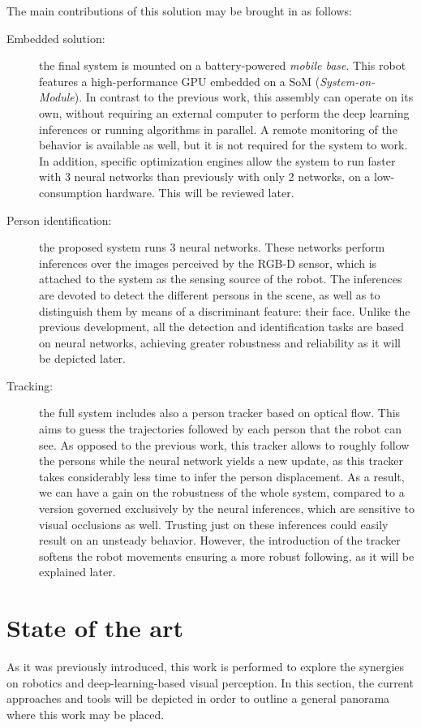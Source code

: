 The main contributions of this solution may be brought in as follows:
\begin{description}
	\item[Embedded solution:] the final system is mounted on a battery-powered \textit{mobile base}. This robot features a high-performance GPU embedded on a SoM (\textit{System-on-Module}). In contrast to the previous work, this assembly can operate on its own, without requiring an external computer to perform the deep learning inferences or running algorithms in parallel. A remote monitoring of the behavior is available as well, but it is not required for the system to work. In addition, specific optimization engines allow the system to run faster with 3 neural networks than previously with only 2 networks, on a low-consumption hardware. This will be reviewed later.

	\item[Person identification:] the proposed system runs 3 neural networks. These networks perform inferences over the images perceived by the RGB-D sensor, which is attached to the system as the sensing source of the robot. The inferences are devoted to detect the different persons in the scene, as well as to distinguish them by means of a discriminant feature: their face. Unlike the previous development, all the detection and identification tasks are based on neural networks, achieving greater robustness and reliability as it will be depicted later.

	\item[Tracking:] the full system includes also a person tracker based on optical flow. This aims to guess the trajectories followed by each person that the robot can see. As opposed to the previous work, this tracker allows to roughly follow the persons while the neural network yields a new update, as this tracker takes considerably less time to infer the person displacement. As a result, we can have a gain on the robustness of the whole system, compared to a version governed exclusively by the neural inferences, which are sensitive to visual occlusions as well. Trusting just on these inferences could easily result on an unsteady behavior. However, the introduction of the tracker softens the robot movements ensuring a more robust following, as it will be explained later.
\end{description}


	
\section{State of the art}
\label{sec:1_sota}
	As it was previously introduced, this work is performed to explore the synergies on robotics and deep-learning-based visual perception. In this section, the current approaches and tools will be depicted in order to outline a general panorama where this work may be placed.\\
	
